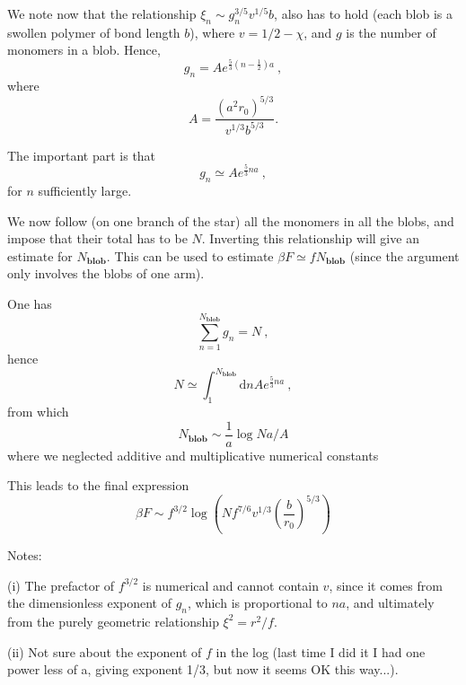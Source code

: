 \documentclass[
preprint,
a4paper,
12pt,
superscriptaddress,
pre]{revtex4}
\begin{document}
We note now that the relationship $\xi_n \sim g_n^{3/5} v^{1/5} b$,
also has to hold (each blob is a swollen polymer of bond length $b$),
where $v=1/2 - \chi$, and $g$ is the number of monomers in a
blob. Hence,
\begin{displaymath}
  g_n = A e^{\frac{5}{3}\left(n-\frac{1}{2}\right)a} \ ,  
\end{displaymath}
where
\begin{displaymath}
 A= \frac{(a^2 r_0)^{5/3}}{v^{1/3} b^{5/3}} . 
\end{displaymath}

The important part is that  
\begin{displaymath}
  g_n \simeq A e^{\frac{5}{3}n a} \ ,  
\end{displaymath}
for $n$ sufficiently large.

We now follow (on one branch of the star) all the monomers in all the
blobs, and impose that their total has to be $N$. Inverting this
relationship will give an estimate for $N_{\mathbf{blob}}$. This can
be used to estimate $\beta F \simeq f N_{\mathbf{blob}}$ (since the
argument only involves the blobs of one arm).

One has
\begin{displaymath}
  \sum_{n=1}^{N_{\mathbf{blob}}} g_n = N \ ,
\end{displaymath}
hence
\begin{displaymath}
  N \simeq \int_{1}^{N_{\mathbf{blob}}} \mathrm{d}n  A e^{\frac{5}{3}n
    a} \ , 
\end{displaymath}
from which
\begin{displaymath}
  N_{\mathbf{blob}} \sim \frac{1}{a} \log N a / A
\end{displaymath}
where we neglected additive and multiplicative numerical constants

This leads to the final expression
\begin{displaymath}
  \beta F \sim f^{3/2} \log 
  \left(  N f^{7/6} v^{1/3}  \left(\frac{b}{r_0} \right)^{5/3} \right)
\end{displaymath}

Notes:

(i) The prefactor of $f^{3/2}$ is numerical and cannot contain $v$,
since it comes from the dimensionless exponent of $g_n$, which is
proportional to $n a$, and ultimately from the purely geometric
relationship $\xi^2 = r^2/f$.

(ii) Not sure about the exponent of $f$ in the log (last time I did it
I had one power less of a, giving exponent 1/3, but now it seems OK
this way...).

\end{document}
